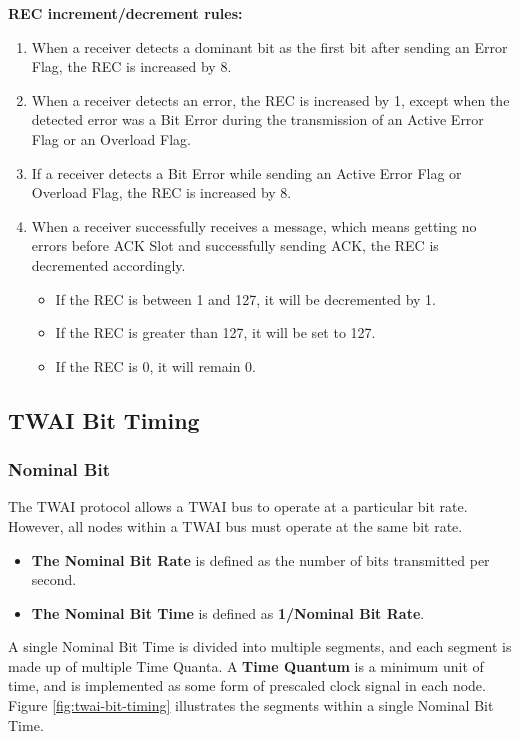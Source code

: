 \documentclass[main\_\_EN.tex]{subfiles}
\begin{document}
\textbf{REC increment/decrement rules:}
\begin{enumerate}
    \item When a receiver detects a dominant bit as the first bit after sending an Error Flag, the REC is increased by 8.
    \item When a receiver detects an error, the REC is increased by 1, except when the detected error was a Bit Error during the transmission of an Active Error Flag or an Overload Flag.
    \item If a receiver detects a Bit Error while sending an Active Error Flag or Overload Flag, the REC is increased by 8.
    \item When a receiver successfully receives a message, which means getting no errors before ACK Slot and successfully sending ACK, the REC is decremented accordingly.
        \begin{itemize}
        \item If the REC is between 1 and 127, it will be decremented by 1.
        \item If the REC is greater than 127, it will be set to 127.
        \item If the REC is 0, it will remain 0.
    \end{itemize}
\end{enumerate}

\subsection{TWAI Bit Timing}
\subsubsection{Nominal Bit}

The TWAI protocol allows a TWAI bus to operate at a particular bit rate. However, all nodes within a TWAI bus must operate at the same bit rate.

\begin{itemize}
    \item \textbf{The Nominal Bit Rate} is defined as the number of bits transmitted per second.
    \item \textbf{The Nominal Bit Time} is defined as \textbf{1/Nominal Bit Rate}.
\end{itemize}

A single Nominal Bit Time is divided into multiple segments, and each segment is made up of multiple Time Quanta. A \textbf{Time Quantum} is a minimum unit of time, and is implemented as some form of prescaled clock signal in each node. Figure \ref{fig:twai-bit-timing} illustrates the segments within a single Nominal Bit Time.
\end{document}
